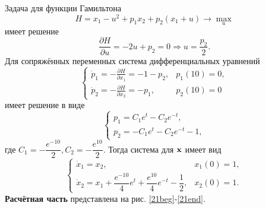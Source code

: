 \documentclass[a4paper, 12pt]{article}
\newcommand{\df}[2]{\frac{\partial #1}{\partial #2}}
\begin{document}
Задача для функции Гамильтона
\begin{equation}
    H=x_1-u^2 +p_1 x_2 +p_2 (x_1 +u) \rightarrow \max_u
\end{equation}
имеет решение 
\begin{equation}
    \df{H}{u}=-2u+p_2=0 \Rightarrow u=\dfrac{p_2}{2}.
\end{equation}
Для сопряжённых переменных система дифференциальных уравнений
\begin{equation}
    \begin{cases}
       \dot p_1 = - \df{H}{x_1}=-1-p_2, & p_1(10)=0,\\
       \dot p_2 = - \df{H}{x_2}=-p_1, & p_2(10)=0
    \end{cases}
\end{equation}
имеет решение в виде
\begin{equation}
    \begin{cases}
        p_1= C_1 e^t - C_2 e^{-t},\\
        p_2 = -C_1 e^t - C_2 e^{-t} -1,
    \end{cases}
\end{equation}
где $C_1 = -\dfrac{e^{-10}}{2},C_2 = -\dfrac{e^{10}}{2}$. Тогда система для ${\bf x}$ имеет вид
\begin{equation}
    \begin{cases}
        \dot x_1 =x_2, & x_1(0)=1,\\
        \dot x_2=x_1+\dfrac{e^{-10}}{4}e^t + \dfrac{e^{10}}{4}e^{-t}-\dfrac{1}{2},& x_2(0)=1.
    \end{cases}
\end{equation}
{\bf Расчётная часть} представлена на рис. \ref{21beg}-\ref{21end}.
\end{document}
